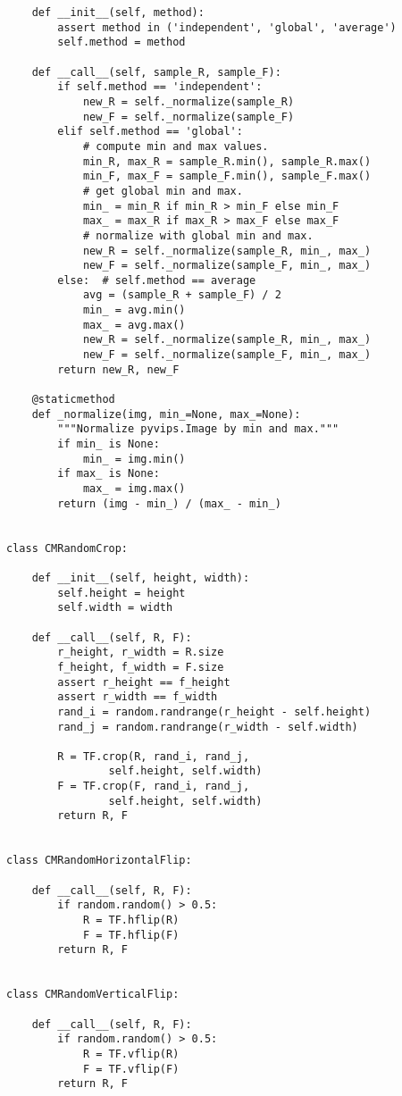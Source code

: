 \documentclass[../main.tex]{subfiles}
\begin{document}
\begin{lstlisting}
    def __init__(self, method):
        assert method in ('independent', 'global', 'average')
        self.method = method

    def __call__(self, sample_R, sample_F):
        if self.method == 'independent':
            new_R = self._normalize(sample_R)
            new_F = self._normalize(sample_F)
        elif self.method == 'global':
            # compute min and max values.
            min_R, max_R = sample_R.min(), sample_R.max()
            min_F, max_F = sample_F.min(), sample_F.max()
            # get global min and max.
            min_ = min_R if min_R > min_F else min_F
            max_ = max_R if max_R > max_F else max_F
            # normalize with global min and max.
            new_R = self._normalize(sample_R, min_, max_)
            new_F = self._normalize(sample_F, min_, max_)
        else:  # self.method == average
            avg = (sample_R + sample_F) / 2
            min_ = avg.min()
            max_ = avg.max()
            new_R = self._normalize(sample_R, min_, max_)
            new_F = self._normalize(sample_F, min_, max_)
        return new_R, new_F

    @staticmethod
    def _normalize(img, min_=None, max_=None):
        """Normalize pyvips.Image by min and max."""
        if min_ is None:
            min_ = img.min()
        if max_ is None:
            max_ = img.max()
        return (img - min_) / (max_ - min_)


class CMRandomCrop:

    def __init__(self, height, width):
        self.height = height
        self.width = width

    def __call__(self, R, F):
        r_height, r_width = R.size
        f_height, f_width = F.size
        assert r_height == f_height
        assert r_width == f_width
        rand_i = random.randrange(r_height - self.height)
        rand_j = random.randrange(r_width - self.width)

        R = TF.crop(R, rand_i, rand_j,
	            self.height, self.width)
        F = TF.crop(F, rand_i, rand_j,
	            self.height, self.width)
        return R, F


class CMRandomHorizontalFlip:

    def __call__(self, R, F):
        if random.random() > 0.5:
            R = TF.hflip(R)
            F = TF.hflip(F)
        return R, F


class CMRandomVerticalFlip:

    def __call__(self, R, F):
        if random.random() > 0.5:
            R = TF.vflip(R)
            F = TF.vflip(F)
        return R, F



\end{lstlisting}
\end{document}
